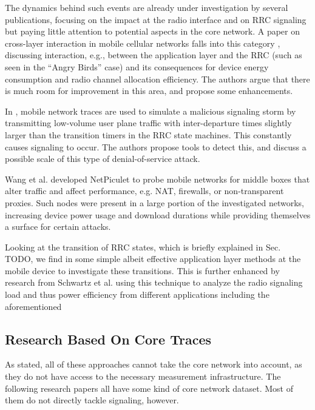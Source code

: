 The dynamics behind such events are already under investigation by several publications, focusing on the impact at the radio interface and on \gls{RRC} signaling but paying little attention to potential aspects in the core network. A paper on cross-layer interaction in mobile cellular networks falls into this category \cite{qian2011profiling}, discussing interaction, e.g., between the application layer and the \gls{RRC} (such as seen in the ``Angry Birds'' case) and its consequences for device energy consumption and radio channel allocation efficiency. The authors argue that there is much room for improvement in this area, and propose some enhancements.


In \cite{lee2007detection}, mobile network traces are used to simulate a malicious signaling storm by transmitting low-volume user plane traffic with inter-departure times slightly larger than the transition timers in the \gls{RRC} state machines. This constantly causes signaling to occur. The authors propose tools to detect this, and discuss a possible scale of this type of denial-of-service attack.

 
Wang et al.\cite{sigcomm11middleboxes} developed NetPiculet to probe mobile networks for middle boxes that alter traffic and affect performance, e.g. NAT, firewalls, or non-transparent proxies. Such nodes were present in a large portion of the investigated networks, increasing device power usage and download durations while providing themselves a surface for certain attacks.

Looking at the transition of \gls{RRC} states, which is briefly explained in Sec. TODO, we find in \cite{5360763} some simple albeit effective application layer methods at the mobile device to investigate these transitions. This is further enhanced by research from Schwartz et al.\cite{schwartz2013angrybirds} using this technique to analyze the radio signaling load and thus power efficiency from different applications including the aforementioned


\subsection{Research Based On Core Traces}

As stated, all of these approaches cannot take the core network into account, as they do not have access to the necessary measurement infrastructure. The following research papers all have some kind of core network dataset. Most of them do not directly tackle signaling, however.

